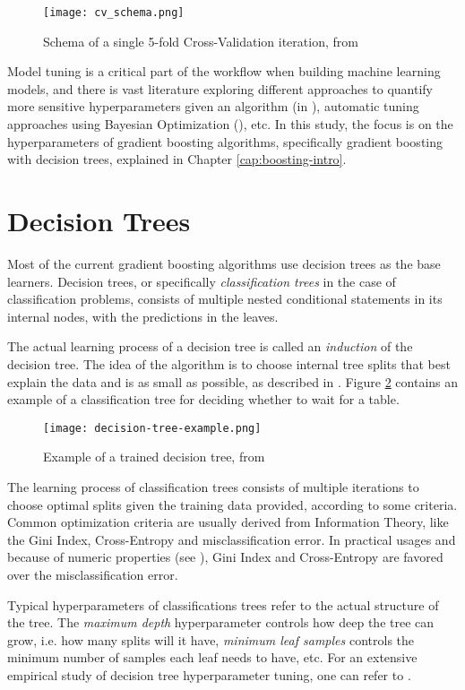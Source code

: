 \begin{figure}[!h]
    \centering
    \texttt{[image: cv\_schema.png]} 
    \caption{Schema of a single 5-fold Cross-Validation iteration, from \cite{hastie2009elements}}
    \label{fig:cvschema}
\end{figure}

Model tuning is a critical part of the workflow when building machine learning models, and there is vast literature exploring different approaches to quantify more sensitive hyperparameters given an algorithm (in \cite{probst2018tunability}), automatic tuning approaches using Bayesian Optimization (\cite{bergstra2013hyperopt}), etc. In this study, the focus is on the hyperparameters of gradient boosting algorithms, specifically gradient boosting with decision trees, explained in Chapter \ref{cap:boosting-intro}.

\section{Decision Trees}

Most of the current gradient boosting algorithms use decision trees as the base learners. Decision trees, or specifically \textit{classification trees} in the case of classification problems, consists of multiple nested conditional statements in its internal nodes, with the predictions in the leaves.

The actual learning process of a decision tree is called an \textit{induction} of the decision tree. The idea of the algorithm is to choose internal tree splits that best explain the data and is as small as possible, as described in \cite{aima:2010}. Figure \ref{fig:decision-tree-example} contains an example of a classification tree for deciding whether to wait for a table.

\begin{figure}[H]
    \centering
    \texttt{[image: decision-tree-example.png]} 
    \caption{Example of a trained decision tree, from \cite{aima:2010}}
    \label{fig:decision-tree-example}
\end{figure}

The learning process of classification trees consists of multiple iterations to choose optimal splits given the training data provided, according to some criteria. Common optimization criteria are usually derived from Information Theory, like the Gini Index, Cross-Entropy and misclassification error. In practical usages and because of numeric properties (see \cite{hastie2009elements}), Gini Index and Cross-Entropy are favored over the misclassification error.

Typical hyperparameters of classifications trees refer to the actual structure of the tree. The \textit{maximum depth} hyperparameter controls how deep the tree can grow, i.e. how many splits will it have, \textit{minimum leaf samples} controls the minimum number of samples each leaf needs to have, etc. For an extensive empirical study of decision tree hyperparameter tuning, one can refer to \cite{mantovani2018empirical}.
